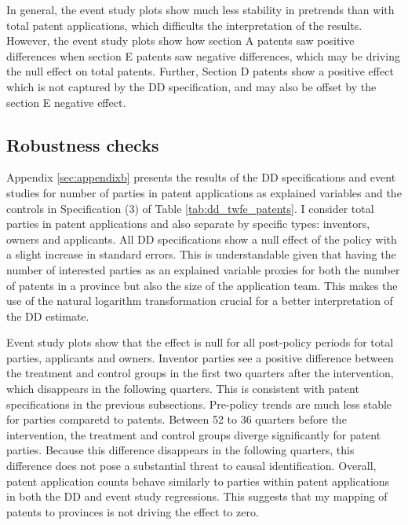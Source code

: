 \documentclass[../main.tex]{subfiles}
\begin{document}
In general, the event study plots show much less stability in pretrends than with total patent applications, which difficults the interpretation of the results. However, the event study plots show how section A patents saw positive differences when section E patents saw negative differences, which may be driving the null effect on total patents. Further, Section D patents show a positive effect which is not captured by the DD specification, and may also be offset by the section E negative effect.

\subsection{Robustness checks}

Appendix \ref{sec:appendixb} presents the results of the DD specifications and event studies for number of parties in patent applications as explained variables and the controls in Specification (3) of Table \ref{tab:dd_twfe_patents}. I consider total parties in patent applications and also separate by specific types: inventors, owners and applicants. All DD specifications show a null effect of the policy with a slight increase in standard errors. This is understandable given that having the number of interested parties as an explained variable proxies for both the number of patents in a province but also the size of the application team. This makes the use of the natural logarithm transformation crucial for a better interpretation of the DD estimate. 

Event study plots show that the effect is null for all post-policy periods for total parties, applicants and owners. Inventor parties see a positive difference between the treatment and control groups in the first two quarters after the intervention, which disappears in the following quarters. This is consistent with patent specifications in the previous subsections. Pre-policy trends are much less stable for parties comparetd to patents. Between 52 to 36 quarters before the intervention, the treatment and control groups diverge significantly for patent parties. Because this difference disappears in the following quarters, this difference does not pose a substantial threat to causal identification. Overall, patent application counts behave similarly to parties within patent applications in both the DD and event study regressions. This suggests that my mapping of patents to provinces is not driving the effect to zero.
\end{document}
